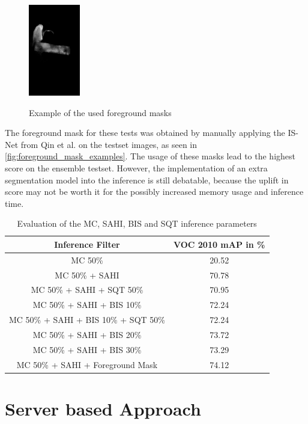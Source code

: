 \documentclass[10pt]{book}
\begin{document}
\begin{figure}
     {\includegraphics[width=0.2\textwidth]{image/foreground_mask_example_hand_mask}}
  \caption{Example of the used foreground masks}
  \label{fig:foreground_mask_examples}
\end{figure}

The foreground mask for these tests was obtained by manually applying the IS-Net from Qin et al. \cite{qin2022} on the testset images, as seen in \autoref{fig:foreground_mask_examples}. The usage of these masks lead to the highest score on the ensemble testset. However, the implementation of an extra segmentation model into the inference is still debatable, because the uplift in score may not be worth it for the possibly increased memory usage and inference time.

\begin{table}
  \begin{tabular}{ c c }
   Inference Filter & VOC 2010 \ac{mAP} in \% \\ 
   \hline
   \ac{MC} 50\% & 20.52 \\
   \ac{MC} 50\% + \ac{SAHI} & 70.78 \\
   \ac{MC} 50\% + \ac{SAHI} + \ac{SQT} 50\% & 70.95 \\
   \ac{MC} 50\% + \ac{SAHI} + \ac{BIS} 10\% & 72.24 \\
   \ac{MC} 50\% + \ac{SAHI} + \ac{BIS} 10\% + \ac{SQT} 50\% & 72.24 \\
   \ac{MC} 50\% + \ac{SAHI} + \ac{BIS} 20\% & 73.72 \\
   \ac{MC} 50\% + \ac{SAHI} + \ac{BIS} 30\% & 73.29 \\
   \ac{MC} 50\% + \ac{SAHI} + Foreground Mask & 74.12 \\
   \hline
  \end{tabular}
  \caption{\label{tab:inference_parameters}Evaluation of the \ac{MC}, \ac{SAHI}, \ac{BIS} and \ac{SQT} inference parameters}
\end{table} %

\section{Server based Approach}
\end{document}
